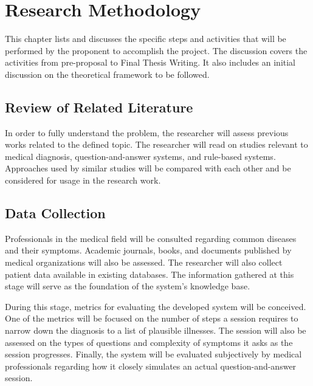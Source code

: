 %
%
%                 

\chapter{Research Methodology}
This chapter lists and discusses the specific steps and activities that will be performed by the proponent to accomplish the project. 
The discussion covers the activities from pre-proposal to Final Thesis Writing.  It also includes an initial discussion on the theoretical
framework to be followed.

\section{Review of Related Literature}
In order to fully understand the problem, the researcher will assess previous works related to the defined topic.
The researcher will read on studies relevant to medical diagnosis, question-and-answer systems, and rule-based systems.
Approaches used by similar studies will be compared with each other and be considered for usage in the research work.

\section{Data Collection}
Professionals in the medical field will be consulted regarding common diseases and their symptoms.
Academic journals, books, and documents published by medical organizations will also be assessed.
The researcher will also collect patient data available in existing databases.
The information gathered at this stage will serve as the foundation of the system's knowledge base.

During this stage, metrics for evaluating the developed system will be conceived.
One of the metrics will be focused on the number of steps a session requires to narrow down the diagnosis to a list of plausible illnesses.
The session will also be assessed on the types of questions and complexity of symptoms it asks as the session progresses.
Finally, the system will be evaluated subjectively by medical professionals regarding how it closely simulates an actual question-and-answer session.

